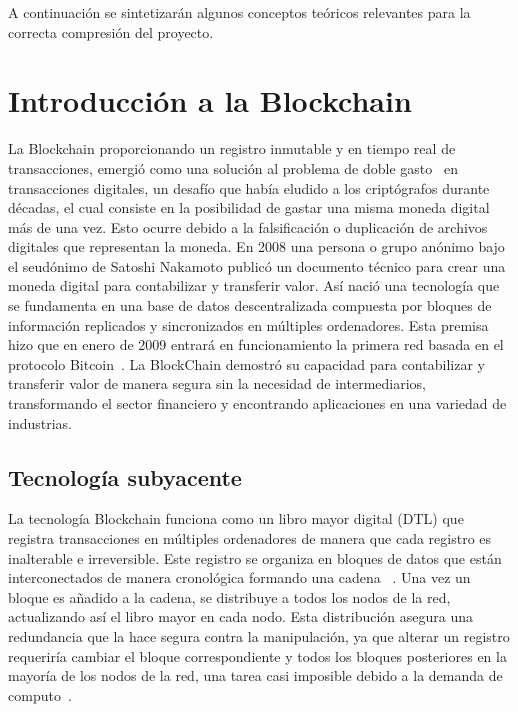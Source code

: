 
A continuación se sintetizarán algunos conceptos teóricos relevantes para la correcta compresión del proyecto.



\section{Introducción a la Blockchain}

La Blockchain proporcionando un registro inmutable y en tiempo real de transacciones, emergió como una solución al problema de doble gasto~\cite{dobleGasto} en transacciones digitales, un desafío que había eludido a los criptógrafos durante décadas, el cual consiste en la posibilidad de gastar una misma moneda digital más de una vez. Esto ocurre debido a la falsificación o duplicación de archivos digitales que representan la moneda.
En 2008 una persona o grupo anónimo bajo el seudónimo de Satoshi Nakamoto publicó un documento técnico para crear una moneda digital para contabilizar y transferir valor. Así nació una tecnología que se fundamenta en una base de datos descentralizada compuesta por bloques de información replicados y sincronizados en múltiples ordenadores.  
Esta premisa hizo que en enero de 2009 entrará en funcionamiento la primera red basada en el protocolo Bitcoin~\cite{introducciónBitcoin}.
La BlockChain demostró su capacidad para contabilizar y transferir valor de manera segura sin la necesidad de intermediarios, transformando el sector financiero y encontrando aplicaciones en una variedad de industrias.




\subsection{Tecnología subyacente}

La tecnología Blockchain funciona como un libro mayor digital (DTL) que registra transacciones en múltiples ordenadores de manera que cada registro es inalterable e irreversible. 
Este registro se organiza en bloques de datos que están interconectados de manera cronológica formando una cadena ~\cite{wiki:DTL}.
Una vez un bloque es añadido a la cadena, se distribuye a todos los nodos de la red, actualizando así el libro mayor en cada nodo. Esta distribución asegura una redundancia que la hace segura contra la manipulación, ya que alterar un registro requeriría cambiar el bloque correspondiente y todos los bloques posteriores en la mayoría de los nodos de la red, una tarea casi imposible debido a la demanda de computo~\cite{BlockchainFuncionamiento}.

